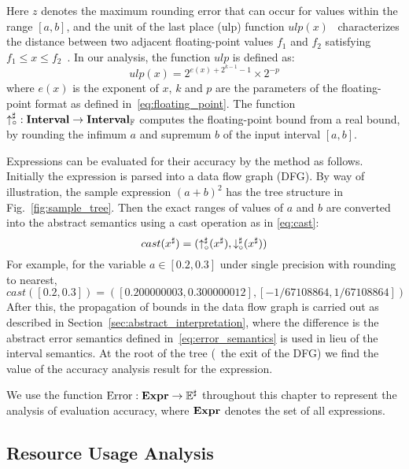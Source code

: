 Here $z$ denotes the maximum rounding error that can occur for values
within the range $[a, b]$, and the unit of the last place (ulp) function
$ulp(x)$~\cite{muller} characterizes the distance between two adjacent
floating-point values $f_1$ and $f_2$ satisfying $f_1 \leq x \leq
f_2$~\cite{goldberg}. In our analysis, the function $ulp$ is defined as:
\begin{equation}
    ulp(x) = 2^{e(x) + 2^{k - 1} - 1} \times 2^{-p}
\end{equation}
where $e(x)$ is the exponent of $x$, $k$ and $p$ are the parameters of the
floating-point format as defined in~\eqref{eq:floating_point}. The function
$\operatorname{\uparrow^\sharp_\circ}: \mathbf{Interval} \to \mathbf{Interval}_\mathbb{F}$ computes the floating-point
bound from a real bound, by rounding the infimum $a$ and supremum $b$ of the
input interval $[a, b]$.

Expressions can be evaluated for their accuracy by the method as follows.
Initially the expression is parsed into a data flow graph (DFG). By way of
illustration, the sample expression ${(a + b)}^2$ has the tree structure
in Fig.~\ref{fig:sample_tree}. Then the exact ranges of values of $a$ and
$b$ are converted into the abstract semantics using a cast operation as in
\eqref{eq:cast}:
\begin{equation}
    cast(x^\sharp) = (\operatorname{\uparrow^\sharp_\circ}(x^\sharp), \operatorname{\downarrow^\sharp_\circ}(x^\sharp))
    \label{eq:cast}
\end{equation}
For example, for the variable $a \in [0.2, 0.3]$ under single precision
with rounding to nearest,
\begin{equation}
    cast([0.2, 0.3]) = ([0.200000003, 0.300000012], [-1/67108864, 1/67108864])
\end{equation}
After this, the propagation of bounds in the data flow graph is carried out as
described in Section~\ref{sec:abstract_interpretation}, where the difference is
the abstract error semantics defined in~\eqref{eq:error_semantics} is used in
lieu of the interval semantics. At the root of the tree (\ie~the exit of the
DFG) we find the value of the accuracy analysis result for the expression.

We use the function $\operatorname{\mathrm{Error}}: \mathbf{Expr}\to\mathbb{E}^\sharp$ throughout this chapter to
represent the analysis of evaluation accuracy, where $\mathbf{Expr}$ denotes the set
of all expressions.

\subsection{Resource Usage Analysis}

